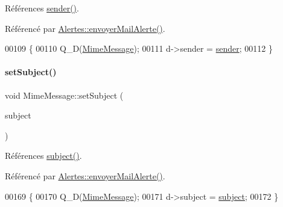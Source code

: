 Références \hyperlink{class_simple_mail_1_1_mime_message_a626953414e4eed9e57ea793eb60a2d6b}{sender()}.



Référencé par \hyperlink{class_alertes_a375783502a78109f3323dc1ed90cfdc9}{Alertes\+::envoyer\+Mail\+Alerte()}.


\begin{DoxyCode}
00109 \{
00110     Q\_D(\hyperlink{class_simple_mail_1_1_mime_message}{MimeMessage});
00111     d->sender = \hyperlink{class_simple_mail_1_1_mime_message_a626953414e4eed9e57ea793eb60a2d6b}{sender};
00112 \}
\end{DoxyCode}
\mbox{\label{class_simple_mail_1_1_mime_message_a525c33895b322e06c35c0d831cfe9b02}} 
\paragraph{\texorpdfstring{set\+Subject()}{setSubject()}}
{\footnotesize\ttfamily void Mime\+Message\+::set\+Subject (\begin{DoxyParamCaption}\item[{const Q\+String \&}]{subject }\end{DoxyParamCaption})}



Références \hyperlink{class_simple_mail_1_1_mime_message_a54274861ea83b4b37dd9db80aca34e39}{subject()}.



Référencé par \hyperlink{class_alertes_a375783502a78109f3323dc1ed90cfdc9}{Alertes\+::envoyer\+Mail\+Alerte()}.


\begin{DoxyCode}
00169 \{
00170     Q\_D(\hyperlink{class_simple_mail_1_1_mime_message}{MimeMessage});
00171     d->subject = \hyperlink{class_simple_mail_1_1_mime_message_a54274861ea83b4b37dd9db80aca34e39}{subject};
00172 \}
\end{DoxyCode}
\mbox{\label{class_simple_mail_1_1_mime_message_ac1f8b71260b9f2ac07505526b3c516b2}} 
